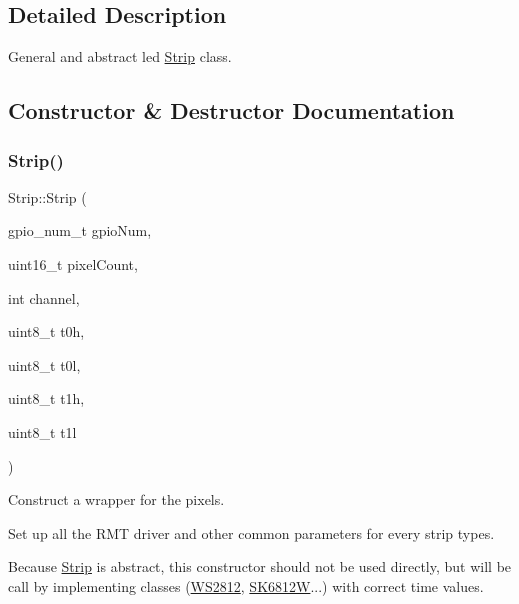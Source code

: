 \subsection{Detailed Description}
General and abstract led \mbox{\hyperlink{classStrip}{Strip}} class. 

\subsection{Constructor \& Destructor Documentation}
\mbox{\label{classStrip_a3f99a9018282c2a0633cf62955967697}} 
\subsubsection{\texorpdfstring{Strip()}{Strip()}}
{\footnotesize\ttfamily Strip\+::\+Strip (\begin{DoxyParamCaption}\item[{gpio\+\_\+num\+\_\+t}]{gpio\+Num,  }\item[{uint16\+\_\+t}]{pixel\+Count,  }\item[{int}]{channel,  }\item[{uint8\+\_\+t}]{t0h,  }\item[{uint8\+\_\+t}]{t0l,  }\item[{uint8\+\_\+t}]{t1h,  }\item[{uint8\+\_\+t}]{t1l }\end{DoxyParamCaption})}



Construct a wrapper for the pixels. 

Set up all the R\+MT driver and other common parameters for every strip types.

Because \mbox{\hyperlink{classStrip}{Strip}} is abstract, this constructor should not be used directly, but will be call by implementing classes (\mbox{\hyperlink{classWS2812}{W\+S2812}}, \mbox{\hyperlink{classSK6812W}{S\+K6812W}}...) with correct time values.


